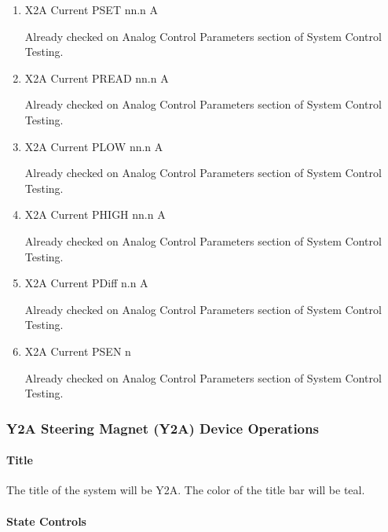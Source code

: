 \documentclass[11pt]{book}		%
\begin{document}
\begin{enumerate}
 \item X2A Current PSET   nn.n A

\color{red}
Already checked on Analog Control Parameters section of System Control Testing.
\color{black}

 \item X2A Current PREAD  nn.n A

\color{red}
Already checked on Analog Control Parameters section of System Control Testing.
\color{black}

 \item X2A Current PLOW   nn.n A

\color{red}
Already checked on Analog Control Parameters section of System Control Testing.
\color{black}

 \item X2A Current PHIGH  nn.n A

\color{red}
Already checked on Analog Control Parameters section of System Control Testing.
\color{black}

 \item X2A Current PDiff n.n A

\color{red}
Already checked on Analog Control Parameters section of System Control Testing.
\color{black}

 \item X2A Current PSEN  n

\color{red}
Already checked on Analog Control Parameters section of System Control Testing.
\color{black}

\end{enumerate}

\subsubsection{Y2A Steering Magnet (Y2A) Device Operations} \label{sect:cyc-op-interface-ops-terminal-device-ops-y2a}

\paragraph{Title} \label{sect:cyc-op-interface-ops-terminal-device-ops-y2a-title}

The title of the system will be Y2A.  The color of the title bar will be teal.

\paragraph{State Controls}
\end{document}
